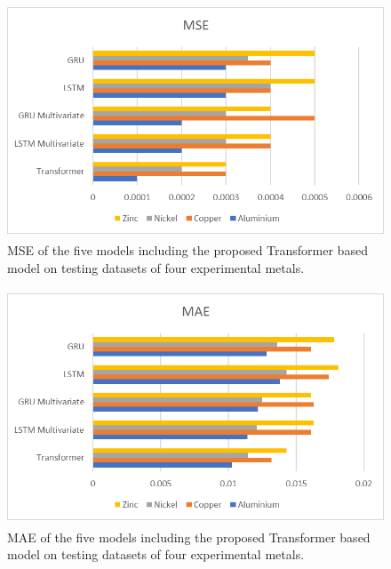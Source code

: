 \documentclass[preprint,12pt]{elsarticle}
\begin{document}
\begin{center}
	\begin{figure}[!htbp]
		\centering
		\includegraphics[width=15cm, height=7cm]{MSE.png}
		\caption{MSE of the five models including the proposed Transformer based model on testing datasets of four experimental metals.}
		\label{fig11}
	\end{figure}
\end{center}

\begin{center}
	\begin{figure}[!htbp]
		\centering
		\includegraphics[width=15cm, height=7cm]{MAE.jpg}
		\caption{MAE of the five models including the proposed Transformer based model on testing datasets of four experimental metals.}
		\label{fig12}
	\end{figure}
\end{center}
\end{document}
